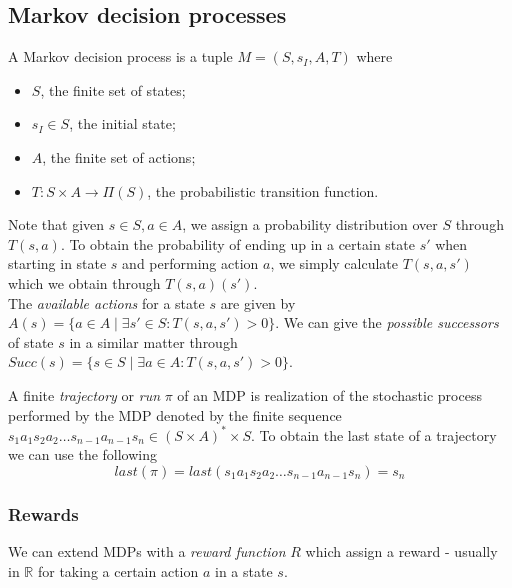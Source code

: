 

\subsection{Markov decision processes}

\begin{definition}[MDP]
	A Markov decision process is a tuple $M=(S,s_I,A,T)$ where 
	\begin{itemize}
		\item $S$, the finite set of states;
		\item $s_I\in S$, the initial state;
		\item $A$, the finite set of actions;
		\item $T:S\times A\to \Pi(S)$, the probabilistic transition function.
	\end{itemize}
\end{definition}

Note that given $s\in S,a\in A$, we assign a probability distribution over $S$ through $T(s,a)$. To obtain the probability of ending up in a certain state $s'$ when starting in state $s$ and performing action $a$, we simply calculate $T(s,a,s')$ which we obtain through $T(s,a)(s')$.\\

The \textit{available actions} for a state $s$ are given by $A(s)=\{a\in A\mid \exists s'\in S: T(s,a,s')>0\}$. We can give the \textit{possible successors} of state $s$ in a similar matter through $Succ(s)=\{s\in S\mid\exists a\in A : T(s,a,s')>0\}$.

A finite \textit{trajectory} or \textit{run} $\pi$ of an MDP is realization of the stochastic process performed by the MDP denoted by the finite sequence $s_1 a_1 s_2 a_2\dots s_{n-1} a_{n-1} s_n \in (S\times A)^*\times S$. To obtain the last state of a trajectory we can use the following \[last(\pi)=last(s_1 a_1 s_2 a_2\dots s_{n-1} a_{n-1} s_n)=s_n\]

\subsubsection*{Rewards}
We can extend MDPs with a \textit{reward function} $R$ which assign a reward - usually in $\mathbb{R}$ for taking a certain action $a$ in a state $s$. 


